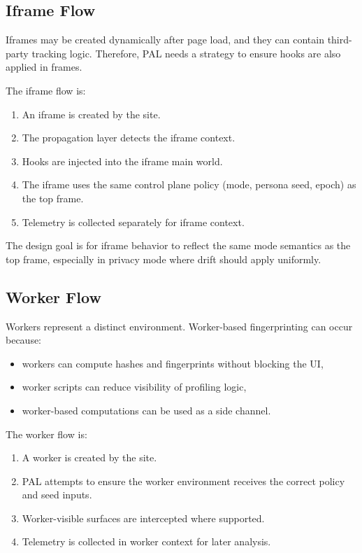 \documentclass[11pt]{report}
\begin{document}
\subsection{Iframe Flow}

Iframes may be created dynamically after page load, and they can contain third-party tracking logic. Therefore, PAL needs a strategy to ensure hooks are also applied in frames.

The iframe flow is:

\begin{enumerate}
    \item An iframe is created by the site.
    \item The propagation layer detects the iframe context.
    \item Hooks are injected into the iframe main world.
    \item The iframe uses the same control plane policy (mode, persona seed, epoch) as the top frame.
    \item Telemetry is collected separately for iframe context.
\end{enumerate}

The design goal is for iframe behavior to reflect the same mode semantics as the top frame, especially in privacy mode where drift should apply uniformly.

\subsection{Worker Flow}

Workers represent a distinct environment. Worker-based fingerprinting can occur because:
\begin{itemize}
    \item workers can compute hashes and fingerprints without blocking the UI,
    \item worker scripts can reduce visibility of profiling logic,
    \item worker-based computations can be used as a side channel.
\end{itemize}

The worker flow is:

\begin{enumerate}
    \item A worker is created by the site.
    \item PAL attempts to ensure the worker environment receives the correct policy and seed inputs.
    \item Worker-visible surfaces are intercepted where supported.
    \item Telemetry is collected in worker context for later analysis.
\end{enumerate}
\end{document}
